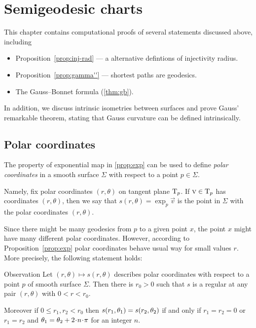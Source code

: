 \chapter{Semigeodesic charts}\label{chap:semigeodesic}

This chapter contains computational proofs of several statements discussed above, including 
\begin{itemize}
\item Proposition~\ref{prop:inj-rad} --- a alternative defintions of injectivity radius.
\item Proposition~\ref{prop:gamma''} --- shortest paths are geodesics.
\item The Gauss--Bonnet formula (\ref{thm:gb}).
\end{itemize}
In addition, we discuss intrinsic isometries between surfaces and prove Gauss' remarkable theorem, stating that Gauss curvature can be defined intrinsically.

\section{Polar coordinates}

The property of exponential map in \ref{prop:exp} can be used to define \emph{polar coordinates} in a smooth surface $\Sigma$ with respect to a point $p\in \Sigma$.

Namely, fix polar coordinates $(r,\theta)$ on tangent plane $\mathrm{T}_p$.
If $\text{\sc{v}}\in \mathrm{T}_p$ has coordinates $(r,\theta)$,
then we say that $s(r,\theta)=\exp_p\vec v$ is the point in $\Sigma$ with the polar coordinates $(r,\theta)$.


Since there might be many geodesics from $p$ to a given point $x$,
the point $x$ might have many different polar coordinates.
However, according to Proposition~\ref{prop:exp} polar coordinates behave usual way for small values $r$.
More precisely, the following statement holds:

\begin{thm}{Observation}\label{obs:polar}
Let $(r,\theta)\mapsto s(r,\theta)$ describes polar coordinates with respect to a point $p$ of smooth surface $\Sigma$.
Then there is $r_0>0$ such that $s$ is a regular at any pair $(r,\theta)$ with $0<r<r_0$.

Moreover if $0\le r_1,r_2<r_0$ then $s(r_1,\theta_1) \z= s(r_2,\theta_2)$ if and only if
$r_1=r_2=0$ or $r_1=r_2$ and $\theta_1\z=\theta_2+2\cdot n\cdot\pi$ for an integer $n$.
\end{thm}

